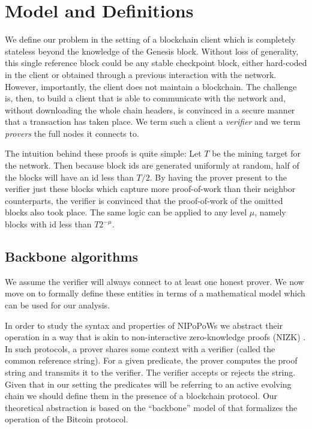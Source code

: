 \section{Model and Definitions}

We define our problem in the setting of a blockchain client which is completely
stateless beyond the knowledge of the Genesis block. Without loss of
generality, this single reference block could be any stable checkpoint block,
either hard-coded in the client or obtained through a previous interaction with
the network. However, importantly, the client does not maintain a blockchain.
The challenge is, then, to build a client that is able to communicate with the
network and, without downloading the whole chain headers, is convinced in a
secure manner that a transaction has taken place. We term such a client a
\textit{verifier} and we term \textit{provers} the full nodes it connects to.

The intuition behind these proofs is quite simple: Let $T$ be the mining target
for the network. Then because block ids are generated uniformly at random, half
of the blocks will have an id less than $T / 2$. By having the prover present to
the verifier just these blocks which capture more proof-of-work than their
neighbor counterparts, the verifier is convinced that the proof-of-work of the
omitted blocks also took place. The same logic can be applied to any level
$\mu$, namely blocks with id less than $T 2^{-\mu}$.

\subsection{Backbone algorithms}

We assume the verifier will always connect to at least one honest prover. We
now move on to formally define these entities in terms of a mathematical model
which can be used for our analysis.

In order to study the syntax and properties of NIPoPoWs
we abstract their operation in a way that is akin to non-interactive
zero-knowledge proofs (NIZK) \cite{BFM88}. In such protocols, a prover
shares some context with a verifier (called the common reference string).
For a given predicate, the prover computes the proof string and transmits it
to the verifier. The verifier accepts or rejects the string. Given that in our
setting the predicates will be referring to an active evolving chain
we should define them in the presence of a blockchain protocol.
Our theoretical abstraction is based on  the ``backbone'' model of
\cite{backbone} that formalizes the operation of the Bitcoin protocol.

